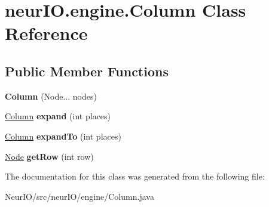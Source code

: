 \hypertarget{classneur_i_o_1_1engine_1_1_column}{}\section{neur\+I\+O.\+engine.\+Column Class Reference}
\label{classneur_i_o_1_1engine_1_1_column}
\subsection*{Public Member Functions}
\begin{DoxyCompactItemize}
\item 
\mbox{\label{classneur_i_o_1_1engine_1_1_column_a5c50cb359c8494adc1d3a240131ac6bd}} 
{\bfseries Column} (Node... nodes)
\item 
\mbox{\label{classneur_i_o_1_1engine_1_1_column_a19d03fcb7a397996c4b9e95bea1aad40}} 
\hyperlink{classneur_i_o_1_1engine_1_1_column}{Column} {\bfseries expand} (int places)
\item 
\mbox{\label{classneur_i_o_1_1engine_1_1_column_a367f262a4bb1df7e2c1c911824b0fa45}} 
\hyperlink{classneur_i_o_1_1engine_1_1_column}{Column} {\bfseries expand\+To} (int places)
\item 
\mbox{\label{classneur_i_o_1_1engine_1_1_column_a7de8bbe0cd9eb4c051e8cb2cd94682c2}} 
\hyperlink{classneur_i_o_1_1system_1_1_node}{Node} {\bfseries get\+Row} (int row)
\end{DoxyCompactItemize}


The documentation for this class was generated from the following file\+:\begin{DoxyCompactItemize}
\item 
Neur\+I\+O/src/neur\+I\+O/engine/Column.\+java\end{DoxyCompactItemize}
